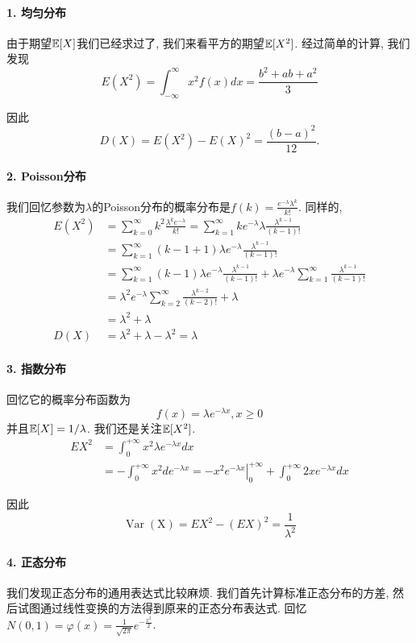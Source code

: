     \paragraph{1. 均匀分布} 由于期望$\mathbb E[X]$我们已经求过了, 我们来看平方的期望$\mathbb E[X^2]$. 经过简单的计算, 我们发现$$
    E\left(X^2\right)=\int_{-\infty}^{\infty} x^2 f(x) d x=\frac{b^2+a b+a^2}{3}
    $$
    
    因此
    $$
    D(X)=E\left(X^2\right)-E(X)^2=\frac{(b-a)^2}{12}.
    $$

    \paragraph{2. Poisson分布} 我们回忆参数为$\lambda$的Poisson分布的概率分布是$f(k )=\frac{e^{-\lambda} \lambda^k}{k !}$. 同样的, 
    $$
    \begin{aligned}
    E\left(X^2\right) & =\sum_{k=0}^{\infty} k^2 \frac{\lambda^k e^{-\lambda}}{k !}=\sum_{k=1}^{\infty} k e^{-\lambda} \lambda \frac{\lambda^{k-1}}{(k-1) !} \\
    & =\sum_{k=1}^{\infty}(k-1+1) \lambda e^{-\lambda} \frac{\lambda^{k-1}}{(k-1) !} \\
    & =\sum_{k=1}^{\infty}(k-1) \lambda e^{-\lambda} \frac{\lambda^{k-1}}{(k-1) !}+\lambda e^{-\lambda} \sum_{k=1}^{\infty} \frac{\lambda^{k-1}}{(k-1) !} \\
    & =\lambda^2 e^{-\lambda} \sum_{k=2}^{\infty} \frac{\lambda^{k-2}}{(k-2) !}+\lambda \\
    & =\lambda^2+\lambda \\
    D(X) & =\lambda^2+\lambda-\lambda^2=\lambda
    \end{aligned}
    $$

    \paragraph{3. 指数分布} 回忆它的概率分布函数为$$
    f(x)=\lambda e^{-\lambda x}, x \geq 0
    $$并且$\mathbb E[X]=1/\lambda$. 我们还是关注$\mathbb E[X^2]$. 
    $$
\begin{aligned}
E X^2 & =\int_0^{+\infty} x^2 \lambda e^{-\lambda x} d x \\
& =-\int_0^{+\infty} x^2 d e^{-\lambda x}=-\left.x^2 e^{-\lambda x}\right|_0 ^{+\infty}+\int_0^{+\infty} 2 x e^{-\lambda x} d x 
\end{aligned}
$$

因此
$$
\operatorname{Var}(\mathrm{X})=E X^2-(E X)^2=\frac{1}{\lambda^2}
$$

\paragraph{4. 正态分布} 我们发现正态分布的通用表达式比较麻烦. 我们首先计算标准正态分布的方差, 然后试图通过线性变换的方法得到原来的正态分布表达式. 回忆$N(0,1)=\varphi(x)=\frac{1}{\sqrt{2 \pi}} e^{-\frac{x^2}{2}}$. 

